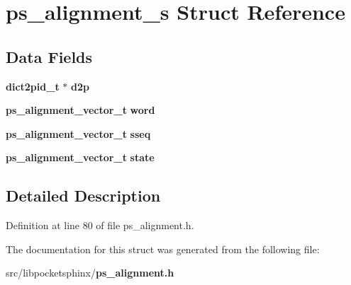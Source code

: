 \section{ps\-\_\-alignment\-\_\-s Struct Reference}
\label{structps__alignment__s}
\subsection*{Data Fields}
\begin{DoxyCompactItemize}
\item 
{\bf dict2pid\-\_\-t} $\ast$ {\bfseries d2p}\label{structps__alignment__s_a0c5367539e2ff9e5808672445c0a1303}

\item 
{\bf ps\-\_\-alignment\-\_\-vector\-\_\-t} {\bfseries word}\label{structps__alignment__s_af0a14378c50f80560198883436a84409}

\item 
{\bf ps\-\_\-alignment\-\_\-vector\-\_\-t} {\bfseries sseq}\label{structps__alignment__s_aa4b417c284b9e331431ea7a433f47e19}

\item 
{\bf ps\-\_\-alignment\-\_\-vector\-\_\-t} {\bfseries state}\label{structps__alignment__s_a1a62f5fce26879f312588de04c010538}

\end{DoxyCompactItemize}


\subsection{Detailed Description}


Definition at line 80 of file ps\-\_\-alignment.\-h.



The documentation for this struct was generated from the following file\-:\begin{DoxyCompactItemize}
\item 
src/libpocketsphinx/{\bf ps\-\_\-alignment.\-h}\end{DoxyCompactItemize}
